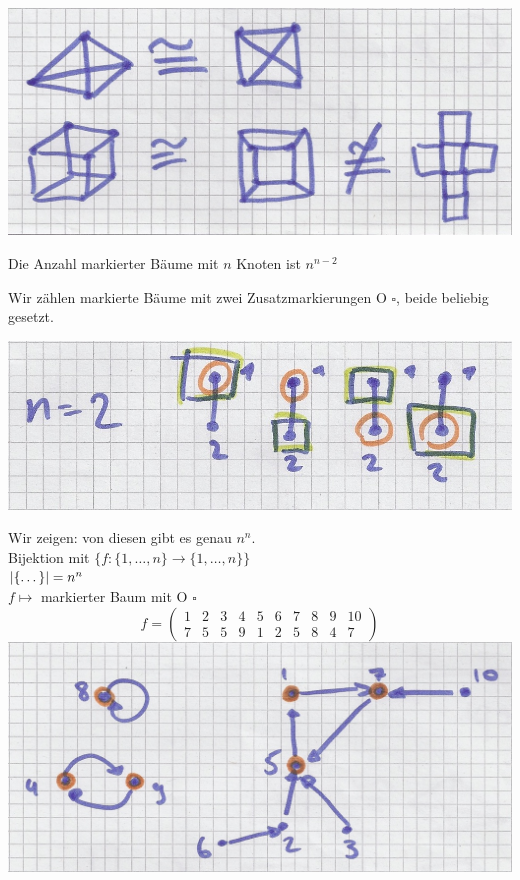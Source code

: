 \begin{bsp*}
	\includegraphics[width=\textwidth]{Bild39}
\end{bsp*}
\begin{satz*}[note = (Cayley)]
	Die Anzahl markierter Bäume mit $n$ Knoten ist $n^{n-2}$
	\begin{bew}
		Wir zählen markierte Bäume mit zwei Zusatzmarkierungen O $\square$, beide beliebig gesetzt.\\
		\begin{bsp*}
			\includegraphics[width=\textwidth]{Bild40}
		\end{bsp*}
		Wir zeigen: von diesen gibt es genau $n^n$.\\
		Bijektion mit $\{f: \{1, \dotsc , n \} \rightarrow \{1, \dotsc , n \} \}$\\
		$\abs{\{\dots\}} = n^n$\\
		$f \mapsto$ markierter Baum mit O $\square$\\
		\[ f = \begin{pmatrix}
			1	&2	&3	&4	&5	&6	&7	&8	&9	&10	\\
			7	&5	&5	&9	&1	&2	&5	&8	&4	&7	
		\end{pmatrix} \]
		\includegraphics[width=\textwidth]{Bild41} \\

\end{bew}
\end{satz*}
